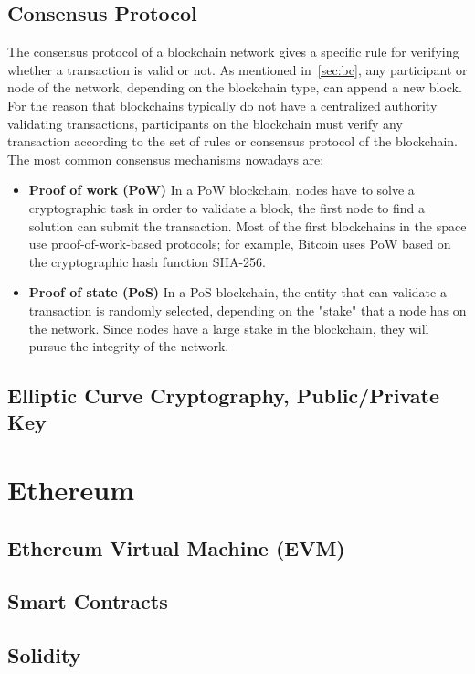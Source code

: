 \documentclass[11pt,a4paper]{report}
\begin{document}
\subsection{Consensus Protocol}
The consensus protocol of a blockchain network gives a specific rule for verifying whether a transaction is valid or not. As mentioned in~\ref{sec:bc}, any participant or node of the network, depending on the blockchain type, can append a new block. For the reason that blockchains typically do not have a centralized authority validating transactions, participants on the blockchain must verify any transaction according to the set of rules or consensus protocol of the blockchain. The most common consensus mechanisms nowadays are:
\begin{itemize}
	\item[] \textbf{Proof of work (PoW)}
	In a PoW blockchain, nodes have to solve a cryptographic task in order to validate a block, the first node to find a solution can submit the transaction. Most of the first blockchains in the space use proof-of-work-based protocols; for example, Bitcoin uses PoW based on the cryptographic hash function SHA-256.	
	\item[] \textbf{Proof of state (PoS)}
	In a PoS blockchain, the entity that can validate a transaction is randomly selected, depending on the "stake" that a node has on the network. Since nodes have a large stake in the blockchain, they will pursue the integrity of the network.

\end{itemize}
\subsection{Elliptic Curve Cryptography, Public/Private Key}


\section{Ethereum}
\subsection{Ethereum Virtual Machine (EVM)}
\subsection{Smart Contracts}
\subsection{Solidity}
\end{document}
